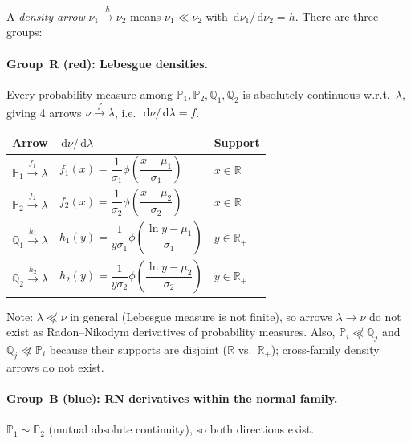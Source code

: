 \documentclass[11pt,a4paper]{article}
\newcommand{\dif}{\,\mathrm{d}}
\newcommand{\R}{\mathbb{R}}
\newcommand{\Rp}{\mathbb{R}_{+}}
\begin{document}
A \emph{density arrow} $\nu_1\xrightarrow{h}\nu_2$ means $\nu_1\ll\nu_2$ with
$\dif\nu_1/\dif\nu_2=h$.  There are three groups:

\paragraph{Group~R (red): Lebesgue densities.}
Every probability measure among $\mathbb{P}_1,\mathbb{P}_2,\mathbb{Q}_1,\mathbb{Q}_2$ is
absolutely continuous w.r.t.\ $\lambda$, giving 4 arrows $\nu\xrightarrow{f}\lambda$,
i.e.\ $\dif\nu/\dif\lambda=f$.

\begin{center}
\renewcommand{\arraystretch}{1.5}
\begin{tabular}{lll}
\toprule
Arrow & $\dif\nu/\dif\lambda$ & Support \\
\midrule
$\mathbb{P}_1\xrightarrow{f_1}\lambda$
  & $f_1(x)=\dfrac{1}{\sigma_1}\phi\!\left(\dfrac{x-\mu_1}{\sigma_1}\right)$
  & $x\in\R$ \\[6pt]
$\mathbb{P}_2\xrightarrow{f_2}\lambda$
  & $f_2(x)=\dfrac{1}{\sigma_2}\phi\!\left(\dfrac{x-\mu_2}{\sigma_2}\right)$
  & $x\in\R$ \\[6pt]
$\mathbb{Q}_1\xrightarrow{h_1}\lambda$
  & $h_1(y)=\dfrac{1}{y\sigma_1}\phi\!\left(\dfrac{\ln y-\mu_1}{\sigma_1}\right)$
  & $y\in\Rp$ \\[6pt]
$\mathbb{Q}_2\xrightarrow{h_2}\lambda$
  & $h_2(y)=\dfrac{1}{y\sigma_2}\phi\!\left(\dfrac{\ln y-\mu_2}{\sigma_2}\right)$
  & $y\in\Rp$ \\
\bottomrule
\end{tabular}
\end{center}

\noindent Note: $\lambda\not\ll\nu$ in general (Lebesgue measure is not finite), so arrows
$\lambda\to\nu$ do not exist as Radon--Nikodym derivatives of probability measures.
Also, $\mathbb{P}_i\not\ll\mathbb{Q}_j$ and $\mathbb{Q}_j\not\ll\mathbb{P}_i$ because their
supports are disjoint ($\R$ vs.\ $\Rp$); cross-family density arrows do not exist.

\paragraph{Group~B (blue): RN derivatives within the normal family.}
$\mathbb{P}_1\sim\mathbb{P}_2$ (mutual absolute continuity), so both directions exist.
\end{document}
